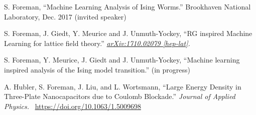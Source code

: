 

\begin{cvparagraph}

    \vspace{2ex}
    \begin{cvitems}
    \item {S. Foreman, ``Machine Learning Analysis of Ising Worms.'' Brookhaven
        National Laboratory, Dec. 2017 (invited speaker)}
    \item {S. Foreman, J. Giedt, Y. Meurice and J. Unmuth-Yockey, ``RG inspired
            Machine Learning for lattice field theory.''
       \textit{\href{https://arxiv.org/abs/1710.02079}{arXiv:1710.02079
   [hep-lat]}.}}
    \item {S. Foreman, Y. Meurice, J. Giedt and J. Unmuth-Yockey, ``Machine
            learning inspired analysis of the Ising model transition.'' (in
           progress)}
    \item {A. Hubler, S. Foreman, J. Liu, and L. Wortsmann, ``Large Energy
            Density in Three-Plate Nanocapacitors due to Coulomb Blockade.''
            \textit{Journal of Applied Physics.}
    ~\href{https://doi.org/10.1063/1.5009698}{https://doi.org/10.1063/1.5009698}}
   \end{cvitems}
\end{cvparagraph}


